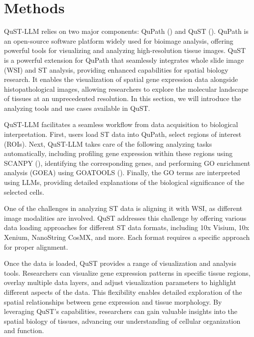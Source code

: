 \documentclass{article}
\begin{document}
\section{Methods}
\label{sec:methods}

QuST-LLM relies on two major components: QuPath (\cite{Bankhead:2017}) and QuST (\cite{Huang:2024}). QuPath is an open-source software platform widely used for bioimage analysis, offering powerful tools for visualizing and analyzing high-resolution tissue images. QuST is a powerful extension for QuPath that seamlessly integrates whole slide image (WSI) and ST analysis, providing enhanced capabilities for spatial biology research. It enables the visualization of spatial gene expression data alongside histopathological images, allowing researchers to explore the molecular landscape of tissues at an unprecedented resolution. In this section, we will introduce the analyzing tools and use cases available in QuST.

QuST-LLM facilitates a seamless workflow from data acquisition to biological interpretation. First, users load ST data into QuPath, select regions of interest (ROIs). Next, QuST-LLM takes care of the following analyzing tasks automatically, including  profiling gene expression within these regions using SCANPY (\cite{Wolf:2018}), identifying the corresponding genes, and performing GO enrichment analysis (GOEA) using GOATOOLS (\cite{Klopfenstein:2018}). Finally, the GO terms are interpreted using LLMs, providing detailed explanations of the biological significance of the selected cells.

One of the challenges in analyzing ST data is aligning it with WSI, as different image modalities are involved. QuST addresses this challenge by offering various data loading approaches for different ST data formats, including 10x Visium, 10x Xenium, NanoString CosMX, and more. Each format requires a specific approach for proper alignment.

Once the data is loaded, QuST provides a range of visualization and analysis tools. Researchers can visualize gene expression patterns in specific tissue regions, overlay multiple data layers, and adjust visualization parameters to highlight different aspects of the data. This flexibility enables detailed exploration of the spatial relationships between gene expression and tissue morphology. By leveraging QuST's capabilities, researchers can gain valuable insights into the spatial biology of tissues, advancing our understanding of cellular organization and function.
\end{document}

